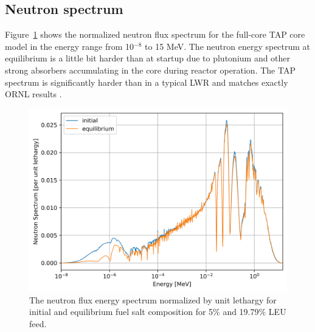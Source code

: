 \documentclass[12pt]{article} %
\begin{document}
\subsection{Neutron spectrum}
Figure~\ref{fig:spectrum} shows the normalized neutron flux spectrum for the 
full-core \gls{TAP} core model in the energy range from 10$^{-8}$ to 15 MeV. 
The neutron energy spectrum at equilibrium is a little bit harder than at 
startup due to plutonium and other strong absorbers accumulating in the 
core during reactor operation. The \gls{TAP} spectrum is significantly 
harder than in a typical \gls{LWR} and matches exactly \gls{ORNL} results 
\cite{betzler_assessment_2017}.
\begin{figure}[htp!] %
  \centering
		  \includegraphics[width=\textwidth]{spectrum.png}
	 \vspace{-0.35in}
  \caption{The neutron flux energy spectrum normalized by unit lethargy 
  for initial and equilibrium fuel 
  salt composition for 5\% and 19.79\% \gls{LEU} feed.}
  \label{fig:spectrum}
\end{figure}
\end{document}
